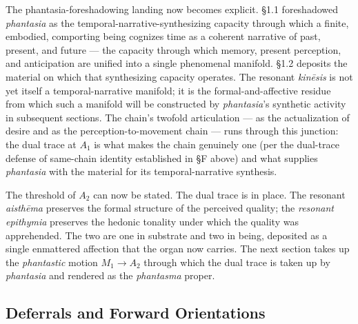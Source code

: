 The phantasia-foreshadowing landing now becomes explicit. §1.1 foreshadowed \textit{phantasia} as the temporal-narrative-synthesizing capacity through which a finite, embodied, comporting being cognizes time as a coherent narrative of past, present, and future --- the capacity through which memory, present perception, and anticipation are unified into a single phenomenal manifold. §1.2 deposits the material on which that synthesizing capacity operates. The resonant \textit{kinēsis} is not yet itself a temporal-narrative manifold; it is the formal-and-affective residue from which such a manifold will be constructed by \textit{phantasia}'s synthetic activity in subsequent sections. The chain's twofold articulation --- as the actualization of desire and as the perception-to-movement chain --- runs through this junction: the dual trace at $A_1$ is what makes the chain genuinely one (per the dual-trace defense of same-chain identity established in §F above) and what supplies \textit{phantasia} with the material for its temporal-narrative synthesis.

The threshold of $A_2$ can now be stated. The dual trace is in place. The resonant \textit{aisthēma} preserves the formal structure of the perceived quality; the \textit{resonant epithymia} preserves the hedonic tonality under which the quality was apprehended. The two are one in substrate and two in being, deposited as a single enmattered affection that the organ now carries. The next section takes up the \textit{phantastic} motion $M_1 \rightarrow A_2$ through which the dual trace is taken up by \textit{phantasia} and rendered as the \textit{phantasma} proper.

\subsection*{Deferrals and Forward Orientations}


